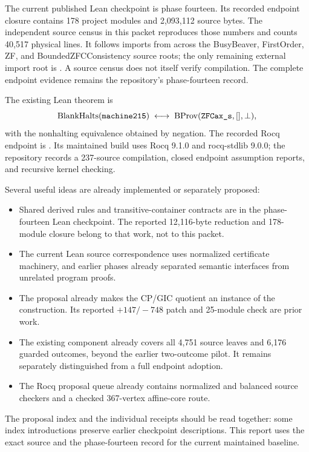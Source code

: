 \documentclass[11pt,letterpaper]{article}
\newcommand{\code}[1]{\texttt{\detokenize{#1}}}
\begin{document}
The current published Lean checkpoint is phase fourteen. Its recorded
endpoint closure contains 178 project modules and 2,093,112 source bytes.
The independent source census in this packet reproduces those numbers and
counts 40,517 physical lines. It follows imports from
 across the BusyBeaver, FirstOrder, ZF,
and BoundedZFCConsistency source roots; the only remaining external import
root is \code{Init}. A source census does not itself verify compilation.
The complete endpoint evidence remains the repository's phase-fourteen
record.\cite{phase14,endpoint}

The existing Lean theorem is
\[
 \operatorname{BlankHalts}(\code{machine215})
 \;\longleftrightarrow\;
 \operatorname{BProv}(\code{ZFCax_s},[],\bot),
\]
with the nonhalting equivalence obtained by negation. The recorded Rocq
endpoint is
.
Its maintained build uses Rocq 9.1.0 and rocq-stdlib 9.0.0; the repository
records a 237-source compilation, closed endpoint assumption reports, and
recursive kernel checking.\cite{candidate,rocqbuild}

Several useful ideas are already implemented or separately proposed:
\begin{itemize}
\item Shared derived rules and transitive-container contracts are in the
phase-fourteen Lean checkpoint. The reported 12,116-byte reduction and
178-module closure belong to that work, not to this packet.
\item The current Lean source correspondence uses normalized certificate
machinery, and earlier phases already separated semantic interfaces from
unrelated program proofs.
\item The  proposal already makes the CP/GIC
quotient an instance of the \code{QHyp} construction. Its reported
\(+147/-748\) patch and 25-module check are prior work.
\item The existing  component already
covers all 4,751 source leaves and 6,176 guarded outcomes, beyond the earlier
two-outcome pilot. It remains separately distinguished from a full endpoint
adoption.
\item The Rocq proposal queue already contains normalized and balanced source
checkers and a checked 367-vertex affine-core route.
\end{itemize}
The proposal index and the individual receipts should be read together:
some index introductions preserve earlier checkpoint descriptions.
This report uses the exact source and the phase-fourteen record for the
current maintained baseline.\cite{proposals,unification,residual}
\end{document}
